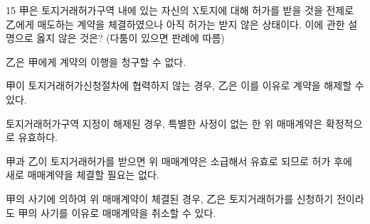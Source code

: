 \begin{question}{15}
甲은 토지거래허가구역 내에 있는 자신의 X토지에 대해 허가를 받을 것을 전제로 乙에게 매도하는 계약을 체결하였으나 아직 허가는 받지 않은 상태이다. 이에 관한 설명으로 옳지 않은 것은? (다툼이 있으면 판례에 따름)
\begin{choices}
  \item 乙은 甲에게 계약의 이행을 청구할 수 없다.
  \item 甲이 토지거래허가신청절차에 협력하지 않는 경우, 乙은 이를 이유로 계약을 해제할 수 있다.
  \item 토지거래허가구역 지정이 해제된 경우, 특별한 사정이 없는 한 위 매매계약은 확정적으로 유효하다.
  \item 甲과 乙이 토지거래허가를 받으면 위 매매계약은 소급해서 유효로 되므로 허가 후에 새로 매매계약을 체결할 필요는 없다.
  \item 甲의 사기에 의하여 위 매매계약이 체결된 경우, 乙은 토지거래허가를 신청하기 전이라도 甲의 사기를 이유로 매매계약을 취소할 수 있다.
\end{choices}
\end{question}
